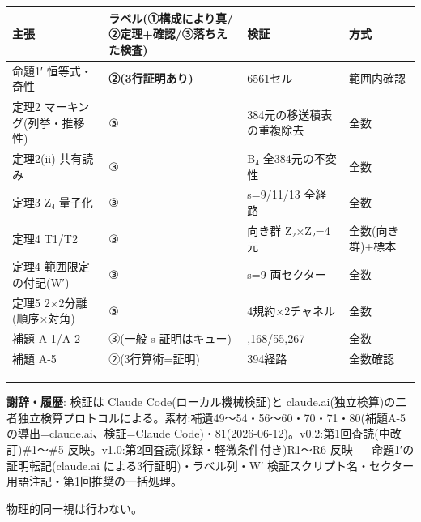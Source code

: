 \documentclass[
]{ltjsarticle}
\newcounter{none} %
\begin{document}
{\def\LTcaptype{none} %
\begin{longtable}[]{@{}
  >{\raggedright\arraybackslash}p{}
  >{\raggedright\arraybackslash}p{}
  >{\raggedright\arraybackslash}p{}
  >{\raggedright\arraybackslash}p{}@{}}
\toprule\noalign{}
\begin{minipage}[b]{\linewidth}\raggedright
主張
\end{minipage} & \begin{minipage}[b]{\linewidth}\raggedright
ラベル(①構成により真/②定理+確認/③落ちえた検査)
\end{minipage} & \begin{minipage}[b]{\linewidth}\raggedright
検証
\end{minipage} & \begin{minipage}[b]{\linewidth}\raggedright
方式
\end{minipage} \\
\midrule\noalign{}
\endhead
\bottomrule\noalign{}
\endlastfoot
命題1′ 恒等式・奇性 & \textbf{②(3行証明あり)} & 6561セル & 範囲内確認 \\
定理2 マーキング(列挙・推移性) & ③ & 384元の移送積表の重複除去 & 全数 \\
定理2(ii) 共有読み & ③ & B₄ 全384元の不変性 & 全数 \\
定理3 Z₄ 量子化 & ③ & s=9/11/13 全経路 & 全数 \\
定理4 T1/T2 & ③ & 向き群 Z₂×Z₂=4元 & 全数(向き群)+標本 \\
定理4 範囲限定の付記(W′) & ③ & s=9 両セクター & 全数 \\
定理5 2×2分離(順序×対角) & ③ & 4規約×2チャネル & 全数 \\
補題 A-1/A-2 & ③(一般 s 証明はキュー) & 103,168/55,267 & 全数 \\
補題 A-5 & ②(3行算術=証明) & 394経路 & 全数確認 \\
\end{longtable}
}

\begin{center}\rule{0.5\linewidth}{0.5pt}\end{center}

\textbf{謝辞・履歴}: 検証は Claude Code(ローカル機械検証)と
claude.ai(独立検算)の二者独立検算プロトコルによる。素材:補遺49〜54・56〜60・70・71・80(補題A-5
の導出=claude.ai、検証=Claude
Code)・81(2026-06-12)。v0.2:第1回査読(中改訂)\#1〜\#5
反映。v1.0:第2回査読(採録・軽微条件付き)R1〜R6 反映 ---
命題1′の証明転記(claude.ai による3行証明)・ラベル列・W′
検証スクリプト名・セクター用語注記・第1回推奨の一括処理。

物理的同一視は行わない。
\end{document}
